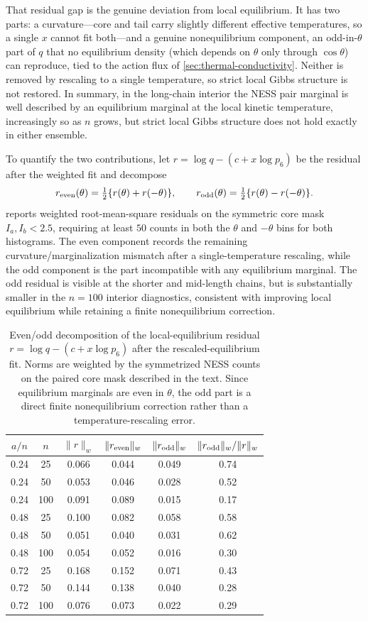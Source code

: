 \documentclass[11pt,a4paper]{article}
\theoremstyle{definition}
\numberwithin{equation}{section}   %
\begin{document}
That residual gap is the genuine deviation from local equilibrium. It has two
parts: a curvature---core and tail carry slightly different effective
temperatures, so a single $x$ cannot fit both---and a genuine nonequilibrium
component, an odd-in-$\theta$ part of $q$ that no equilibrium density (which
depends on $\theta$ only through $\cos\theta$) can reproduce, tied to the
action flux of \cref{sec:thermal-conductivity}. Neither is removed by
rescaling to a single temperature, so strict local Gibbs structure is not
restored. In summary, in the long-chain interior the NESS pair marginal is
well described by an equilibrium marginal at the local kinetic temperature,
increasingly so as $n$ grows, but strict local Gibbs structure does not hold
exactly in either ensemble.

To quantify the two contributions, let
$r=\log q-(c+x\log p_6)$ be the residual after the weighted fit and decompose
\[
  r_{\rm even}(\theta)=\tfrac12\{r(\theta)+r(-\theta)\},\qquad
  r_{\rm odd}(\theta)=\tfrac12\{r(\theta)-r(-\theta)\}.
\]
 reports weighted root-mean-square residuals on the
symmetric core mask $I_a,I_b<2.5$, requiring at least $50$ counts in both the
$\theta$ and $-\theta$ bins for both histograms. The even component records the
remaining curvature/marginalization mismatch after a single-temperature
rescaling, while the odd component is the part incompatible with any
equilibrium marginal. The odd residual is visible at the shorter and
mid-length chains, but is substantially smaller in the $n=100$ interior
diagnostics, consistent with improving local equilibrium while retaining a
finite nonequilibrium correction.

\begin{table}[ht]\centering
\small
\begin{tabular}{cccccc}
\toprule
$a/n$ & $n$ & $\|r\|_w$ & $\|r_{\rm even}\|_w$ &
$\|r_{\rm odd}\|_w$ & $\|r_{\rm odd}\|_w/\|r\|_w$ \\
\midrule
0.24 & 25  & 0.066 & 0.044 & 0.049 & 0.74 \\
0.24 & 50  & 0.053 & 0.046 & 0.028 & 0.52 \\
0.24 & 100 & 0.091 & 0.089 & 0.015 & 0.17 \\
\midrule
0.48 & 25  & 0.100 & 0.082 & 0.058 & 0.58 \\
0.48 & 50  & 0.051 & 0.040 & 0.031 & 0.62 \\
0.48 & 100 & 0.054 & 0.052 & 0.016 & 0.30 \\
\midrule
0.72 & 25  & 0.168 & 0.152 & 0.071 & 0.43 \\
0.72 & 50  & 0.144 & 0.138 & 0.040 & 0.28 \\
0.72 & 100 & 0.076 & 0.073 & 0.022 & 0.29 \\
\bottomrule
\end{tabular}
\caption{Even/odd decomposition of the local-equilibrium residual
$r=\log q-(c+x\log p_6)$ after the rescaled-equilibrium fit. Norms are
weighted by the symmetrized NESS counts on the paired core mask described in
the text. Since equilibrium marginals are even in $\theta$, the odd part is a
direct finite nonequilibrium correction rather than a temperature-rescaling
error.}
\label{tab:lte-resid-decomp}
\end{table}
\end{document}
